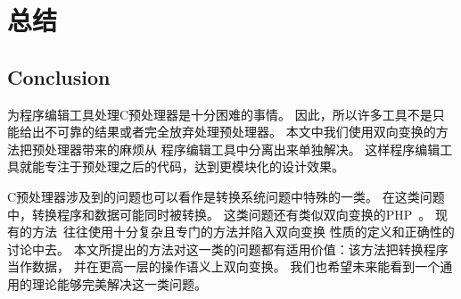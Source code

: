 \chapter{总结}
\section{Conclusion}
\label{sec:conclusion}

为程序编辑工具处理C预处理器是十分困难的事情。
因此，所以许多工具不是只能给出不可靠的结果或者完全放弃处理预处理器。
本文中我们使用双向变换的方法把预处理器带来的麻烦从
程序编辑工具中分离出来单独解决。
这样程序编辑工具就能专注于预处理之后的代码，达到更模块化的设计效果。

C预处理器涉及到的问题也可以看作是转换系统问题中特殊的一类。
在这类问题中，转换程序和数据可能同时被转换。
这类问题还有类似双向变换的PHP~\parencite{wang2012automating}。
现有的方法~\parencite{wang2012automating}往往使用十分复杂且专门的方法并陷入双向变换
性质的定义和正确性的讨论中去。
本文所提出的方法对这一类的问题都有适用价值：该方法把转换程序当作数据，
并在更高一层的操作语义上双向变换。
我们也希望未来能看到一个通用的理论能够完美解决这一类问题。



